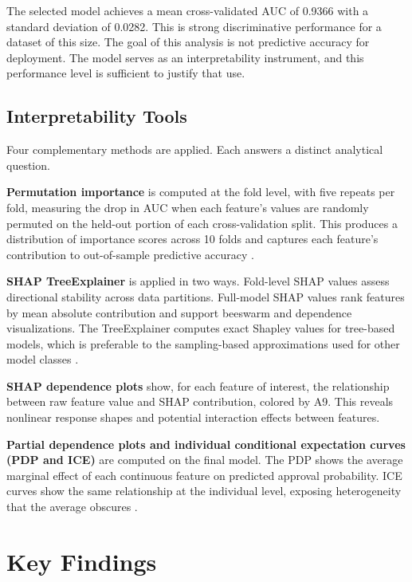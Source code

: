 \documentclass[11pt]{article}
\begin{document}
The selected model achieves a mean cross-validated AUC of 0.9366 with a standard deviation of 0.0282. This is strong discriminative performance for a dataset of this size. The goal of this analysis is not predictive accuracy for deployment. The model serves as an interpretability instrument, and this performance level is sufficient to justify that use.

\subsection{Interpretability Tools}

Four complementary methods are applied. Each answers a distinct analytical question.

\textbf{Permutation importance} is computed at the fold level, with five repeats per fold, measuring the drop in AUC when each feature's values are randomly permuted on the held-out portion of each cross-validation split. This produces a distribution of importance scores across 10 folds and captures each feature's contribution to out-of-sample predictive accuracy \citep{breiman2001, strobl2007}.

\textbf{SHAP TreeExplainer} is applied in two ways. Fold-level SHAP values assess directional stability across data partitions. Full-model SHAP values rank features by mean absolute contribution and support beeswarm and dependence visualizations. The TreeExplainer computes exact Shapley values for tree-based models, which is preferable to the sampling-based approximations used for other model classes \citep{lundberg2017}.

\textbf{SHAP dependence plots} show, for each feature of interest, the relationship between raw feature value and SHAP contribution, colored by A9. This reveals nonlinear response shapes and potential interaction effects between features.

\textbf{Partial dependence plots and individual conditional expectation curves (PDP and ICE)} are computed on the final model. The PDP shows the average marginal effect of each continuous feature on predicted approval probability. ICE curves show the same relationship at the individual level, exposing heterogeneity that the average obscures \citep{goldstein2015, molnar2022}.


\newpage

\section{Key Findings}
\end{document}
